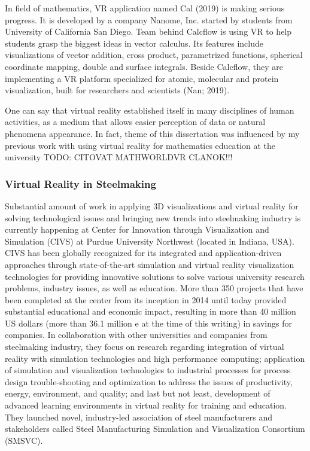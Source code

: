 In field of mathematics, VR application named Cal (2019) is making serious progress. It is developed by a company Nanome, Inc. started by students from University of California San Diego. Team behind Calcflow is using VR to help students grasp the biggest ideas in vector calculus. Its features include visualizations of vector addition, cross product, parametrized functions, spherical coordinate mapping, double and surface integrals. Beside Calcflow, they are implementing a VR platform specialized for atomic, molecular and protein visualization, built for researchers and scientists (Nan; 2019).

One can say that virtual reality established itself in many disciplines of human activities, as a medium that allows easier perception of data or natural phenomena appearance. In fact, theme of this dissertation was influenced by my previous work with using virtual reality for mathematics education at the university TODO: CITOVAT MATHWORLDVR CLANOK!!!

\subsubsection{Virtual Reality in Steelmaking}
Substantial amount of work in applying 3D visualizations and virtual reality for solving technological issues and bringing new trends into steelmaking industry is currently happening at Center for Innovation through Visualization and Simulation (CIVS) at Purdue University Northwest (located in Indiana, USA). CIVS has been globally recognized for its integrated and application-driven approaches through state-of-the-art simulation and virtual reality visualization technologies for providing innovative solutions to solve various university research problems, industry issues, as well as education. More than 350 projects that have been completed at the center from its inception in 2014 until today provided substantial educational and economic impact, resulting in more than 40 million US dollars (more than 36.1 million e at the time of this writing) in savings for companies. In collaboration with other universities and companies from steelmaking industry, they focus on research regarding integration of virtual reality with simulation technologies and high performance computing; application of simulation and visualization technologies to industrial processes for process design trouble-shooting and optimization to address the issues of productivity, energy, environment, and quality; and last but not least, development of advanced learning environments in virtual reality for training and education. They launched novel, industry-led association of steel manufacturers and stakeholders called Steel Manufacturing Simulation and Visualization Consortium (SMSVC).

